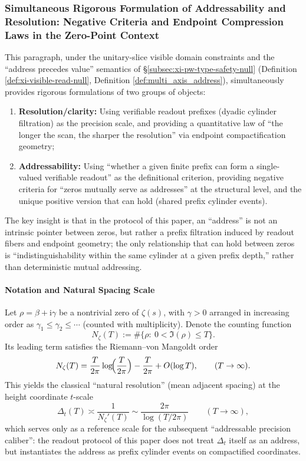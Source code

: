 \subsubsection{Simultaneous Rigorous Formulation of Addressability and Resolution: Negative Criteria and Endpoint Compression Laws in the Zero-Point Context}\label{subsubsec:xi-addressability-resolution-law}
This paragraph, under the unitary-slice visible domain constraints and the ``address precedes value'' semantics of \S\ref{subsec:xi-pw-type-safety-null} (Definition \ref{def:xi-visible-read-null}, Definition \ref{def:multi_axis_address}), simultaneously provides rigorous formulations of two groups of objects:
\begin{enumerate}
  \item \textbf{Resolution/clarity:} Using verifiable readout prefixes (dyadic cylinder filtration) as the precision scale, and providing a quantitative law of ``the longer the scan, the sharper the resolution'' via endpoint compactification geometry;
  \item \textbf{Addressability:} Using ``whether a given finite prefix can form a single-valued verifiable readout'' as the definitional criterion, providing negative criteria for ``zeros mutually serve as addresses'' at the structural level, and the unique positive version that can hold (shared prefix cylinder events).
\end{enumerate}
The key insight is that in the protocol of this paper, an ``address'' is not an intrinsic pointer between zeros, but rather a prefix filtration induced by readout fibers and endpoint geometry; the only relationship that can hold between zeros is ``indistinguishability within the same cylinder at a given prefix depth,'' rather than deterministic mutual addressing.

\paragraph{Notation and Natural Spacing Scale}
Let \(\rho=\beta+\mathrm{i}\gamma\) be a nontrivial zero of \(\zeta(s)\), with \(\gamma>0\) arranged in increasing order as \(\gamma_1\le\gamma_2\le\cdots\) (counted with multiplicity). Denote the counting function
\[
N_\zeta(T):=\#\{\rho:\ 0<\Im(\rho)\le T\}.
\]
Its leading term satisfies the Riemann--von Mangoldt order
\[
N_\zeta(T)=\frac{T}{2\pi}\log\!\Bigl(\frac{T}{2\pi}\Bigr)-\frac{T}{2\pi}+O(\log T),
\qquad(T\to\infty).
\]
This yields the classical ``natural resolution'' (mean adjacent spacing) at the height coordinate \(t\)-scale
\[
\Delta_t(T)\asymp \frac{1}{N_\zeta'(T)}\sim \frac{2\pi}{\log(T/2\pi)}\qquad(T\to\infty),
\]
which serves only as a reference scale for the subsequent ``addressable precision caliber'': the readout protocol of this paper does not treat \(\Delta_t\) itself as an address, but instantiates the address as prefix cylinder events on compactified coordinates.

